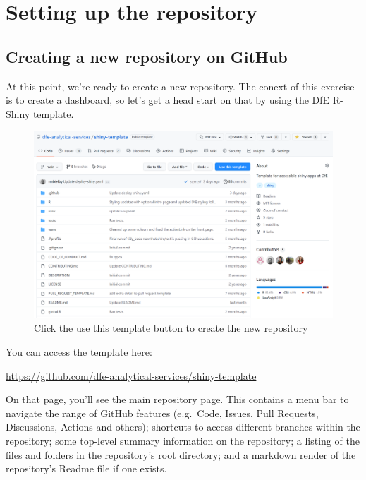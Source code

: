 \documentclass[
  12pt,
]{article}
\begin{document}
\newpage

\hypertarget{setting-up-the-repository}{%
\section{Setting up the repository}\label{setting-up-the-repository}}

\hypertarget{creating-a-new-repository-on-github}{%
\subsection{Creating a new repository on
GitHub}\label{creating-a-new-repository-on-github}}

At this point, we're ready to create a new repository. The conext of
this exercise is to create a dashboard, so let's get a head start on
that by using the DfE R-Shiny template.

\begin{figure}
\centering
\includegraphics{images/gitdemo/gitdemo-shinydash-template.png}
\caption{Click the use this template button to create the new
repository}
\end{figure}

You can access the template here:

\url{https://github.com/dfe-analytical-services/shiny-template}

On that page, you'll see the main repository page. This contains a menu
bar to navigate the range of GitHub features (e.g.~Code, Issues, Pull
Requests, Discussions, Actions and others); shortcuts to access
different branches within the repository; some top-level summary
information on the repository; a listing of the files and folders in the
repository's root directory; and a markdown render of the repository's
Readme file if one exists.
\end{document}
